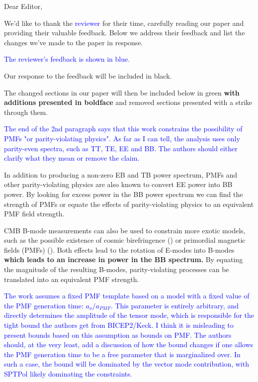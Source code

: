 \documentclass{article}
\newcommand{\added}[1]{\textbf{#1}}
\newcommand{\reviewer}[1]{\textcolor{Blue}{#1}}
\newcommand{\diff}[1]{\textcolor{PineGreen}{#1}}
\begin{document}
Dear Editor,

We'd like to thank the \reviewer{reviewer} for their time, carefully reading our paper and providing their valuable feedback. Below we address their feedback and list the changes we've made to the paper in response.


\reviewer{The reviewer's feedback is shown in blue.}

Our response to the feedback will be included in black. 

\diff{The changed sections in our paper will then be included below in green \added{with additions presented in boldface} and removed sections presented with a strike through them.}


\reviewer{The end of the 2nd paragraph says that this work constrains the possibility of PMFs "or parity-violating physics". As far as I can tell, the analysis uses only parity-even spectra, such as TT, TE, EE and BB. The authors should either clarify what they mean or remove the claim.}

In addition to producing a non-zero EB and TB power spectrum, PMFs and other parity-violating physics are also known to convert EE power into BB power. By looking for excess power in the BB power spectrum we can find the strength of PMFs or equate the effects of parity-violating physics to an equivalent PMF field strength.

\diff{CMB B-mode measurements can also be used to constrain more exotic models, such as the possible existence of cosmic birefringence (\citep{carroll98,lue99}) or primordial magnetic fields (PMFs) (\citep{kosowsky96, seshadri01}).  
Both effects lead to the rotation of E-modes into B-modes \textbf{which leads to an increase in power in the BB spectrum.}
 By equating the magnitude of the resulting B-modes, parity-violating processes can be translated into an equivalent PMF strength.  }


\reviewer{The work assumes a fixed PMF template based on a model with a fixed value of the PMF generation time: $a_{\nu}/a_{PMF}$. This parameter is entirely arbitrary, and directly determines the amplitude of the tensor mode, which is responsible for the tight bound the authors get from BICEP2/Keck. I think it is misleading to present bounds based on this assumption as bounds on PMF. The authors should, at the very least, add a discussion of how the bound changes if one allows the PMF generation time to be a free parameter that is marginalized over. In such a case, the bound will be dominated by the vector mode contribution, with SPTPol likely dominating the constraints.}
\end{document}

